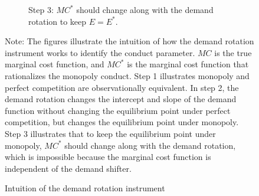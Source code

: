 \documentclass[11pt, a4paper]{article}
\theoremstyle{remark}
\begin{document}
\begin{figure}[p!]
\begin{center}
\begin{subfigure}[b]{0.5\textwidth}
            \caption{Step 3: $MC^{*}$ should change along with the demand rotation to keep $E = E^{*}$.}
            \label{fig:identification_example_step_3}
        \end{subfigure}
    \end{center}
    \caption{Intuition of the demand rotation instrument}
    \label{fig:identification_example}
    \vspace{2mm}
    \footnotesize
    Note: The figures illustrate the intuition of how the demand rotation instrument works to identify the conduct parameter.
    $MC$ is the true marginal cost function, and $MC^{*}$ is the marginal cost function that rationalizes the monopoly conduct.
    Step 1 illustrates monopoly and perfect competition are observationally equivalent.
    In step 2, the demand rotation changes the intercept and slope of the demand function without changing the equilibrium point under perfect competition, but changes the equilibrium point under monopoly.
    Step 3 illustrates that to keep the equilibrium point under monopoly, $MC^{*}$ should change along with the demand rotation, which is impossible because the marginal cost function is independent of the demand shifter.
\end{figure}
\end{document}
